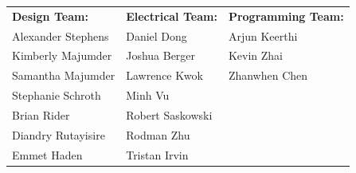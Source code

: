 \documentclass[12pt]{article}
\begin{document}
\begin{titlepage}
\vspace*{0.2in}

\centering
\footnotesize{
 \begin{tabular}{l l l}
  \textbf{Design Team:}&  \textbf{Electrical Team:} & \textbf{Programming Team:} \\
  Alexander Stephens   &  Daniel Dong      &  Arjun Keerthi  \\
  Kimberly Majumder    &  Joshua Berger    &  Kevin Zhai     \\
  Samantha Majumder    &  Lawrence Kwok    &  Zhanwhen Chen  \\
  Stephanie Schroth    &  Minh Vu          &                 \\
  Brian Rider          &  Robert Saskowski &                 \\
  Diandry  Rutayisire  &  Rodman Zhu       &                 \\
  Emmet Haden          &  Tristan Irvin    &                 \\
 \end{tabular}
}

\vspace*{0.3in}




\end{titlepage}
\end{document}
